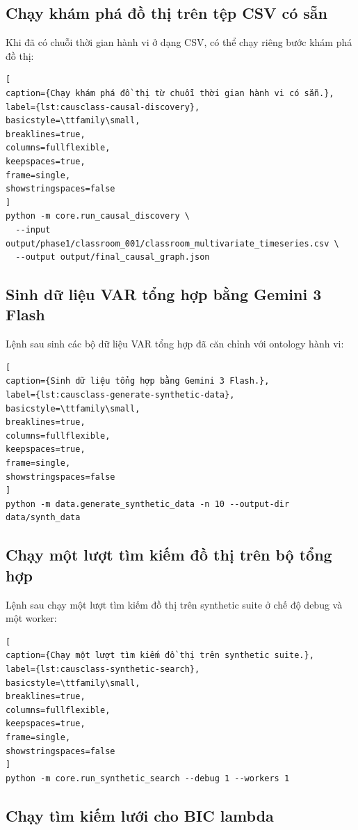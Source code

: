 \subsection{Chạy khám phá đồ thị trên tệp CSV có sẵn}

Khi đã có chuỗi thời gian hành vi ở dạng CSV, có thể chạy riêng bước khám phá đồ thị:

\begin{lstlisting}[
caption={Chạy khám phá đồ thị từ chuỗi thời gian hành vi có sẵn.},
label={lst:causclass-causal-discovery},
basicstyle=\ttfamily\small,
breaklines=true,
columns=fullflexible,
keepspaces=true,
frame=single,
showstringspaces=false
]
python -m core.run_causal_discovery \
  --input output/phase1/classroom_001/classroom_multivariate_timeseries.csv \
  --output output/final_causal_graph.json
\end{lstlisting}

\subsection{Sinh dữ liệu VAR tổng hợp bằng Gemini 3 Flash}

Lệnh sau sinh các bộ dữ liệu VAR tổng hợp đã căn chỉnh với ontology hành vi:

\begin{lstlisting}[
caption={Sinh dữ liệu tổng hợp bằng Gemini 3 Flash.},
label={lst:causclass-generate-synthetic-data},
basicstyle=\ttfamily\small,
breaklines=true,
columns=fullflexible,
keepspaces=true,
frame=single,
showstringspaces=false
]
python -m data.generate_synthetic_data -n 10 --output-dir data/synth_data
\end{lstlisting}

\subsection{Chạy một lượt tìm kiếm đồ thị trên bộ tổng hợp}

Lệnh sau chạy một lượt tìm kiếm đồ thị trên synthetic suite ở chế độ debug và một worker:

\begin{lstlisting}[
caption={Chạy một lượt tìm kiếm đồ thị trên synthetic suite.},
label={lst:causclass-synthetic-search},
basicstyle=\ttfamily\small,
breaklines=true,
columns=fullflexible,
keepspaces=true,
frame=single,
showstringspaces=false
]
python -m core.run_synthetic_search --debug 1 --workers 1
\end{lstlisting}

\subsection{Chạy tìm kiếm lưới cho BIC lambda}

